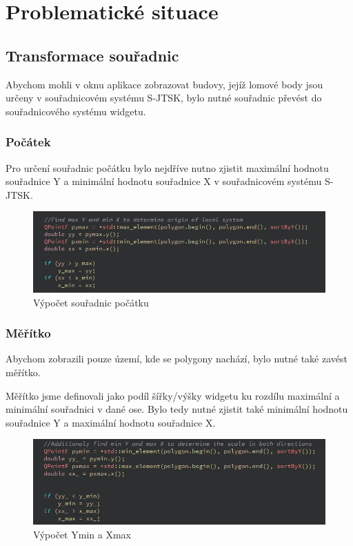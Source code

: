 \documentclass[11pt]{article}
\begin{document}
	\section{Problematické situace}
	
	\subsection{Transformace souřadnic}
	Abychom mohli v oknu aplikace zobrazovat budovy, jejíž lomové body jsou určeny v souřadnicovém systému S-JTSK, bylo nutné souřadnic převést do souřadnicového systému widgetu. 
	
	\subsubsection{Počátek}
	Pro určení souřadnic počátku bylo nejdříve nutno zjistit maximální hodnotu souřadnice Y a minimální hodnotu souřadnice X v souřadnicovém systému S-JTSK. 
	
	\begin{figure}[htbh]
		\centering
		\includegraphics[scale=0.8]{images/U2_problem_pocatek.png} 
		\caption{Výpočet souřadnic počátku}
		\label{fig:problem_origin}
	\end{figure} 
	
	\subsubsection{Měřítko}
	Abychom zobrazili pouze území, kde se polygony nachází, bylo nutné také zavést měřítko.
	
	Měřítko jsme definovali jako podíl šířky/výšky widgetu ku rozdílu maximální a minimální souřadnici v dané ose. Bylo tedy nutné zjistit také minimální hodnotu souřadnice Y a maximální hodnotu souřadnice X.
	
	\begin{figure}[htbh]
		\centering
		\includegraphics[scale=0.8]{images/U2_problem_meritko1.png} 
		\caption{Výpočet Ymin a Xmax}
		\label{fig:problem_scale1}
	\end{figure} 
	
\end{document}
